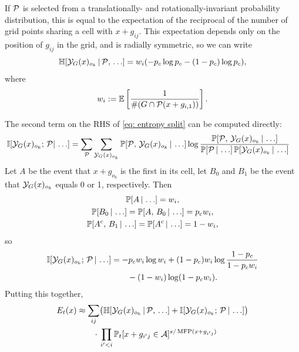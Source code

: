 If $\P$ is selected from a translationally- and rotationally-invariant probability distribution,
this is equal to the expectation of the reciprocal of the number of grid points sharing a cell with $x+g_{ij}$.  
This expectation depends only on the position of $g_{ij}$ in the grid, and is radially symmetric, so we can write
\begin{equation}\HH[\Y_G(x)_{o_k}\,|\,\P,\,\ldots]=
w_i(-p_c\log p_c - (1-p_c)\log p_c),\end{equation}                                   
where
$$w_i:=\EE\left[\frac{1}{\#(G\cap\P(x+g_{i,1}))}\right].$$

The second term on the RHS of \ref{eq: entropy split} can be computed directly:
\begin{align*} 
\II[\Y_G(x)_{o_k};\,\P|\,\ldots]&=\sum_{\P}\sum_{\Y_G(x)_{o_k}} 
\PP[\P,\, \Y_G(x)_{o_k}\,|\,\ldots] \log\frac{\PP[\P,\, \Y_G(x)_{o_k}\,|\,\ldots]}
{\PP[\P\,|\,\ldots]\,\PP[\Y_G(x)_{o_k}\,|\,\ldots]}
\end{align*}
Let $A$ be the event that $x+g_{o_k}$ is the first in its cell,
let $B_0$ and $B_1$ be the event that $\Y_G(x)_{o_k}$ equals 0 or 1, respectively.
Then
\begin{gather*}
\PP[A\,|\,\ldots] = w_i,\\
\PP[B_0\,|\,\ldots] = \PP[A,\,B_0\,|\,\ldots] = p_cw_i,\\
\PP[A^c,\,B_1\,|\,\ldots] = \PP[A^c\,|\,\ldots] = 1-w_i,
\end{gather*}
so
\begin{align*}
 \II[\Y_G(x)_{o_k};\,\P\,|\,\ldots] 
&= -p_cw_i\log w_i + (1-p_c)w_i\log\frac{1-p_c}{1-p_cw_i}\\
&\qquad - (1-w_i)\log(1-p_cw_i).
\end{align*}
Putting this together,
\begin{align}
 E_t(x) &\approx \sum_{ij}\bigl(\HH[\Y_G(x)_{o_k}\,|\,\P,\,\ldots] + \II[\Y_G(x)_{o_k};\,\P\,|\,\ldots]\bigr)\notag\\
 &\qquad\cdot\,\prod_{i\1<i}\PP_t[x+g_{i\1j}\in\A]^{s/\operatorname{MFP}(x+g_{i\1j})}
\label{eq: cell value}
\end{align}

